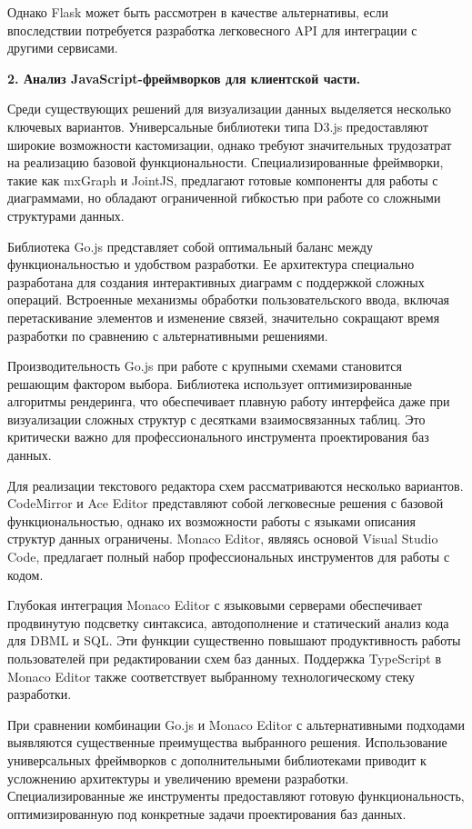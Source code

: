 Однако Flask может быть рассмотрен в качестве альтернативы, если впоследствии потребуется разработка легковесного API для интеграции с другими сервисами.

\textbf{2. Анализ JavaScript-фреймворков для клиентской части.}

Среди существующих решений для визуализации данных выделяется несколько ключевых вариантов. Универсальные библиотеки типа D3.js предоставляют широкие возможности кастомизации, однако требуют значительных трудозатрат на реализацию базовой функциональности. Специализированные фреймворки, такие как mxGraph и JointJS, предлагают готовые компоненты для работы с диаграммами, но обладают ограниченной гибкостью при работе со сложными структурами данных.

Библиотека Go.js представляет собой оптимальный баланс между функциональностью и удобством разработки. Ее архитектура специально разработана для создания интерактивных диаграмм с поддержкой сложных операций. Встроенные механизмы обработки пользовательского ввода, включая перетаскивание элементов и изменение связей, значительно сокращают время разработки по сравнению с альтернативными решениями.

Производительность Go.js при работе с крупными схемами становится решающим фактором выбора. Библиотека использует оптимизированные алгоритмы рендеринга, что обеспечивает плавную работу интерфейса даже при визуализации сложных структур с десятками взаимосвязанных таблиц. Это критически важно для профессионального инструмента проектирования баз данных.

Для реализации текстового редактора схем рассматриваются несколько вариантов. CodeMirror и Ace Editor представляют собой легковесные решения с базовой функциональностью, однако их возможности работы с языками описания структур данных ограничены. Monaco Editor, являясь основой Visual Studio Code, предлагает полный набор профессиональных инструментов для работы с кодом.

Глубокая интеграция Monaco Editor с языковыми серверами обеспечивает продвинутую подсветку синтаксиса, автодополнение и статический анализ кода для DBML и SQL. Эти функции существенно повышают продуктивность работы пользователей при редактировании схем баз данных. Поддержка TypeScript в Monaco Editor также соответствует выбранному технологическому стеку разработки.

При сравнении комбинации Go.js и Monaco Editor с альтернативными подходами выявляются существенные преимущества выбранного решения. Использование универсальных фреймворков с дополнительными библиотеками приводит к усложнению архитектуры и увеличению времени разработки. Специализированные же инструменты предоставляют готовую функциональность, оптимизированную под конкретные задачи проектирования баз данных.

